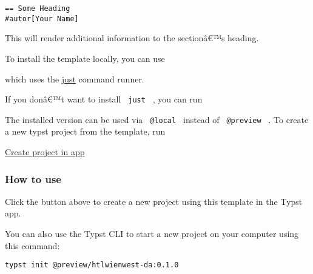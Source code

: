 \begin{verbatim}
== Some Heading
#autor[Your Name]
\end{verbatim}

This will render additional information to the sectionâ€™s heading.

To install the template locally, you can use

\begin{Shaded}
\begin{Highlighting}[]
\end{Highlighting}
\end{Shaded}

which uses the \href{https://github.com/casey/just}{just} command
runner.

If you donâ€™t want to install \texttt{\ just\ } , you can run

\begin{Shaded}
\begin{Highlighting}[]
\end{Highlighting}
\end{Shaded}

The installed version can be used via \texttt{\ @local\ } instead of
\texttt{\ @preview\ } . To create a new typst project from the template,
run

\begin{Shaded}
\begin{Highlighting}[]
\end{Highlighting}
\end{Shaded}

\href{/app?template=htlwienwest-da&version=0.1.0}{Create project in app}

\subsubsection{How to use}\label{how-to-use}

Click the button above to create a new project using this template in
the Typst app.

You can also use the Typst CLI to start a new project on your computer
using this command:

\begin{verbatim}
typst init @preview/htlwienwest-da:0.1.0
\end{verbatim}



